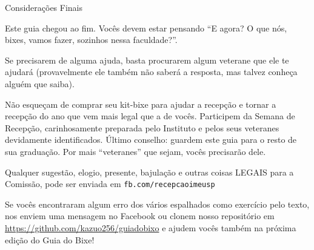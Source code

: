 \begin{secao}{Considerações Finais}

Este guia chegou ao fim. Vocês devem estar pensando ``E agora? O que nós, bixes,
vamos fazer, sozinhos nessa faculdade?''.

Se precisarem de alguma ajuda, basta procurarem algum veterane que ele te
ajudará (provavelmente ele também não saberá a resposta, mas talvez conheça alguém que saiba).

Não esqueçam de comprar seu kit-bixe para ajudar a recepção e tornar a recepção
do ano que vem mais legal que a de vocês. Participem da Semana de Recepção,
carinhosamente preparada pelo Instituto e pelos seus veteranes devidamente
identificados. Último conselho: guardem este guia para o resto de sua graduação.
Por mais ``veteranes'' que sejam, vocês precisarão dele.

Qualquer sugestão, elogio, presente, bajulação e outras coisas LEGAIS para a
Comissão, pode ser enviada em {\tt fb.com/recepcaoimeusp}

Se vocês encontraram algum erro dos vários espalhados como exercício pelo texto,
nos enviem uma mensagem no Facebook ou clonem nosso repositório em
\url{https://github.com/kazuo256/guiadobixo} e ajudem vocês também na próxima
edição do Guia do Bixe!

\end{secao}
